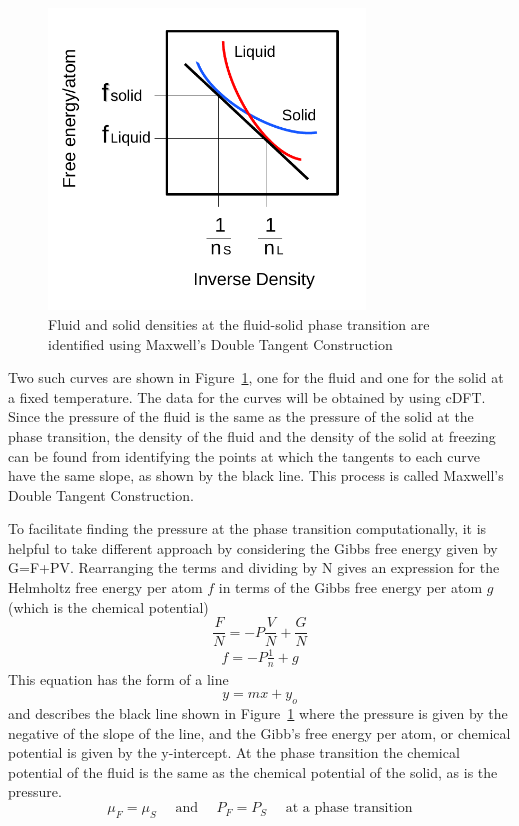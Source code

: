 \documentclass[double,12pt]{beavtex}
\begin{document}
 \begin{figure}
    \centering
     \includegraphics[height=8cm]{figs/MaxwellDTC-Fig1.pdf}
    \caption{Fluid and solid densities at the fluid-solid phase 
    transition are identified using Maxwell's Double Tangent Construction}
    \label{fig:MaxwellDT}
  \end{figure}

Two such curves are shown in Figure~\ref{fig:MaxwellDT}, one for the fluid
and one for the solid at a fixed temperature. 
The data for the curves 
will be obtained by using cDFT. 
Since the pressure of the 
fluid is the same as the pressure of the solid at the phase transition, 
the density of the fluid and the density of the solid at 
freezing can be found from identifying the points at which the 
tangents to each curve have the same slope, as shown by the black line. 
This process is called Maxwell's Double Tangent Construction. 

To facilitate finding the pressure at the phase transition computationally, 
it is helpful to take different approach by considering the Gibbs free energy given by G=F+PV. 
Rearranging the terms and dividing by N gives an  expression for the 
Helmholtz free energy per atom $f$ in terms of the Gibbs free energy 
per atom  $g$ (which is the chemical potential)  
\begin{equation}\frac{F}{N} = -P\frac{V}{N}+\frac{G}{N} \end{equation}
\begin{align}f=-P\frac{1}{n}+g\end{align}
This equation has the form of a line
\begin{equation}
    y=mx+y_o
\end{equation}
and describes the black line shown in Figure~\ref{fig:MaxwellDT} where the 
pressure is given by the negative of the slope of the line, and the Gibb's 
free energy per atom, or chemical potential is given by the y-intercept. 
At the phase transition the chemical potential of the fluid is 
the same as the chemical potential of the solid, as is the pressure.
\begin{equation}
    \mu_F=\mu_S\mbox{~~~~and~~~~}P_F=P_S\mbox{~~~~at a phase transition}
\end{equation} 
\end{document}
